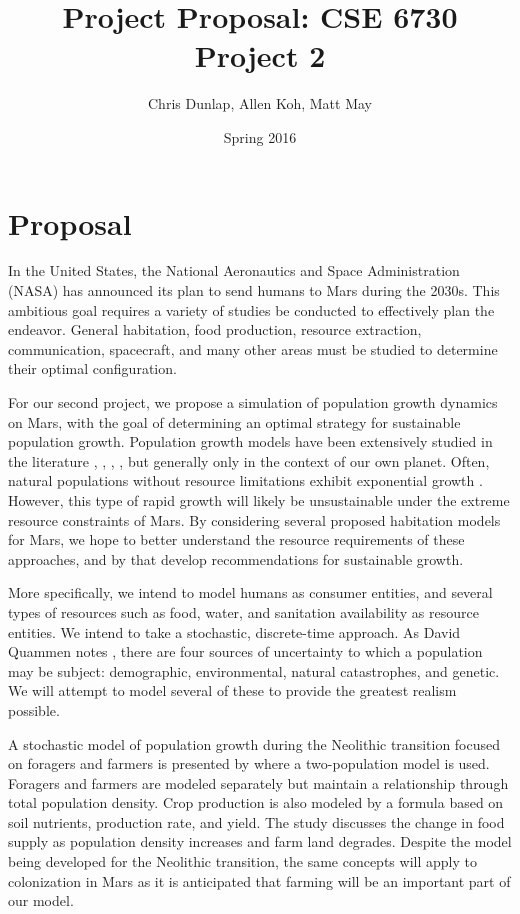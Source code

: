 \documentclass[12pt]{article}
\title{Project Proposal: CSE 6730 Project 2}
\author{Chris Dunlap, Allen Koh, Matt May}
\date{Spring 2016}
\begin{document}
\begin{titlepage}
  \maketitle
  \thispagestyle{empty}
\end{titlepage}

\newpage
  \tableofcontents
  \thispagestyle{empty}
\newpage

\section{Proposal}
\label{sec:proposal}

In the United States, the National Aeronautics and Space Administration (NASA)
has announced its plan to send humans to Mars during the 2030s. This ambitious
goal requires a variety of studies be conducted to effectively plan the
endeavor. General habitation, food production, resource extraction,
communication, spacecraft, and many other areas must be studied to determine
their optimal configuration.

For our second project, we propose a simulation of population growth dynamics on
Mars, with the goal of determining an optimal strategy for sustainable
population growth. Population growth models have been extensively studied in the
literature \cite{clark1967population}, \cite{caswell2001matrix},
\cite{meadows1992beyond}, \cite{boserup1983population},
\cite{ehrlich1971impact} but generally only in the context of our own planet.
Often, natural populations without resource limitations exhibit exponential
growth \cite{audesirk1996biology}. However, this type of rapid growth will
likely be unsustainable under the extreme resource constraints of Mars.
By considering several proposed habitation models for Mars, we hope to better
understand the resource requirements of these approaches, and by that develop
recommendations for sustainable growth.

More specifically, we intend to model humans as consumer entities, and several
types of resources such as food, water, and sanitation availability as resource
entities. We intend to take a stochastic, discrete-time approach. As David
Quammen notes \cite{quammen1996song}, there are four sources of uncertainty to
which a population may be subject: demographic, environmental, natural
catastrophes, and genetic. We will attempt to model several of these to
provide the greatest realism possible.

A stochastic model of population growth	during the Neolithic transition focused on foragers and farmers is presented by \cite{fedotov2008stochastic} where a two-population model is used. Foragers and farmers are modeled separately but maintain a relationship through total population density.  Crop production is also modeled by a formula based on soil nutrients, production rate, and yield.  The study discusses the change in food supply as population density increases and farm land degrades.  Despite the model being developed for the Neolithic transition, the same concepts will apply to colonization in Mars as it is anticipated that farming will be an important part of our model.
\end{document}
